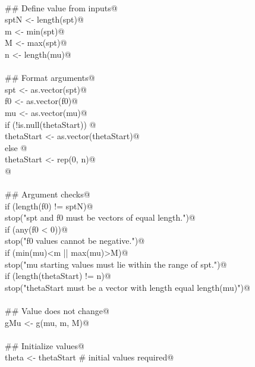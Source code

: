 \documentclass[reqno]{amsart}
\begin{document}
\begin{flushleft}
\begin{list}{}{}
\mbox{}\verb@@\\
\mbox{}\verb@    ## Define value from inputs@\\
\mbox{}\verb@    sptN <- length(spt)@\\
\mbox{}\verb@    m <- min(spt)@\\
\mbox{}\verb@    M <- max(spt)@\\
\mbox{}\verb@    n <- length(mu)@\\
\mbox{}\verb@@\\
\mbox{}\verb@    ## Format arguments@\\
\mbox{}\verb@    spt <- as.vector(spt)@\\
\mbox{}\verb@    f0 <- as.vector(f0)@\\
\mbox{}\verb@    mu <- as.vector(mu)@\\
\mbox{}\verb@    if (!is.null(thetaStart)) {@\\
\mbox{}\verb@        thetaStart <- as.vector(thetaStart)@\\
\mbox{}\verb@    } else {@\\
\mbox{}\verb@        thetaStart <- rep(0, n)@\\
\mbox{}\verb@    }@\\
\mbox{}\verb@@\\
\mbox{}\verb@    ## Argument checks@\\
\mbox{}\verb@    if (length(f0) != sptN)@\\
\mbox{}\verb@        stop("spt and f0 must be vectors of equal length.")@\\
\mbox{}\verb@    if (any(f0 < 0))@\\
\mbox{}\verb@        stop("f0 values cannot be negative.")@\\
\mbox{}\verb@    if (min(mu)<m || max(mu)>M)@\\
\mbox{}\verb@        stop("mu starting values must lie within the range of spt.")@\\
\mbox{}\verb@    if (length(thetaStart) != n)@\\
\mbox{}\verb@        stop("thetaStart must be a vector with length equal length(mu)")@\\
\mbox{}\verb@@\\
\mbox{}\verb@    ## Value does not change@\\
\mbox{}\verb@    gMu <- g(mu, m, M)@\\
\mbox{}\verb@@\\
\mbox{}\verb@    ## Initialize values@\\
\mbox{}\verb@    theta <- thetaStart  # initial values required@\\

\end{list}
\end{flushleft}
\end{document}

